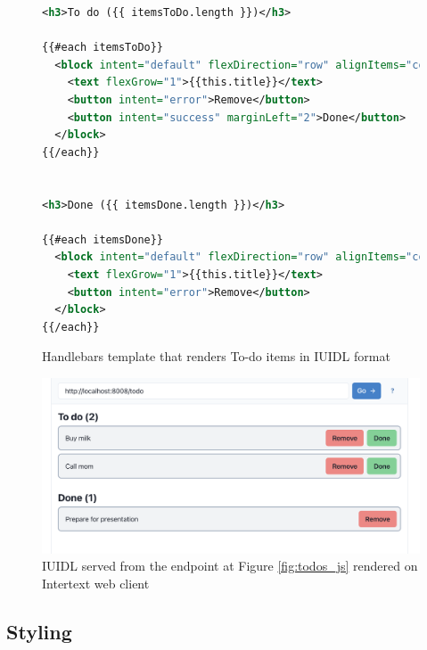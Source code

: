\begin{figure}
\begin{minipage}{\linewidth}
\begin{lstlisting}[language=xml]
<h3>To do ({{ itemsToDo.length }})</h3>

{{#each itemsToDo}}
  <block intent="default" flexDirection="row" alignItems="center" paddingLeft="4">
    <text flexGrow="1">{{this.title}}</text>
    <button intent="error">Remove</button>
    <button intent="success" marginLeft="2">Done</button>
  </block>
{{/each}}


<h3>Done ({{ itemsDone.length }})</h3>

{{#each itemsDone}}
  <block intent="default" flexDirection="row" alignItems="center" paddingLeft="4">
    <text flexGrow="1">{{this.title}}</text>
    <button intent="error">Remove</button>
  </block>
{{/each}}
\end{lstlisting}
\end{minipage}
\caption{Handlebars template that renders To-do items in IUIDL format}%
\label{fig:todos_template}%
\end{figure}

\begin{figure}
  \centering
  \includegraphics[width=13cm]{thesis/paper/images/todos.png}
  \caption{IUIDL served from the endpoint at Figure \ref{fig:todos_js} rendered on Intertext web client}%
  \label{fig:todos_output}%
\end{figure}

\subsection{Styling}


